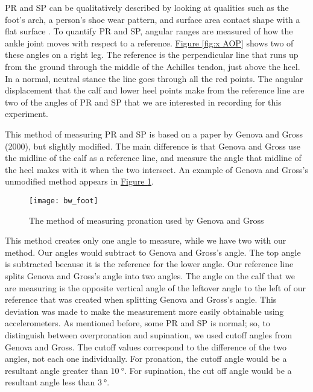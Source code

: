 PR and SP can be qualitatively described by looking at qualities such as the foot’s arch, a person's shoe wear pattern, and surface area contact shape with a flat surface \parencite{erickson}.
To quantify PR and SP, angular ranges are measured of how the ankle joint moves with respect to a reference.
\hyperref[{fig:x AOP}]{Figure \ref*{fig:x AOP}} shows two of these angles on a right leg.
The reference is the perpendicular line that runs up from the ground through the middle of the  Achilles tendon, just above the heel.
In a normal, neutral stance the line goes through all the red points.
The angular displacement that the calf and lower heel points make from the reference line are two of the angles of PR and SP that we are interested in recording for this experiment.\par

This method of measuring PR and SP is based on a paper by Genova and Gross (2000), but slightly modified\nocite{genova}.
The main difference is that Genova and Gross use the midline of the calf as a reference line, and measure the angle that midline of the heel makes with it when the two intersect.
An example of Genova and Gross's unmodified method appears in \hyperref[{fig:x gg orig.}]{Figure \ref*{fig:x gg orig.}}.\par

\begin{figure}[h]
  \centering
  \texttt{[image: bw\_foot]}
  \caption[Method of Genova and Gross]{The method of measuring pronation used by Genova and Gross \parencite{tsai}}
  \label{fig:x gg orig.}
\end{figure}

This method creates only one angle to measure, while we have two with our method.
Our angles would subtract to Genova and Gross’s angle.
The top angle is subtracted because it is the reference for the lower angle.
Our reference line splits Genova and Gross’s angle into two angles.
The angle on the calf that we are measuring is the opposite vertical angle of the leftover angle to the left of our reference that was created when splitting Genova and Gross’s angle.
This deviation was made to make the measurement more easily obtainable using accelerometers.
As mentioned before, some PR and SP is normal; so, to distinguish between overpronation and supination, we used cutoff angles from Genova and Gross.
The cutoff values correspond to the difference of the two angles, not each one individually.
For pronation, the cutoff angle would be a resultant angle greater than $\SI{10}{\degree}$.
For supination, the cut off angle would be a resultant angle less than $\SI{3}{\degree}$.\par

